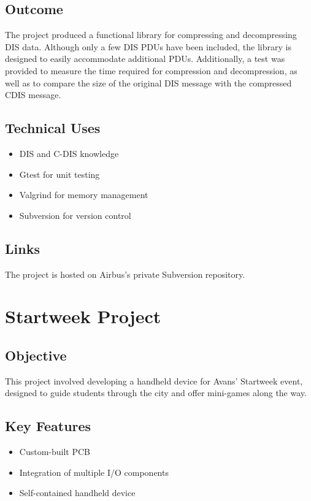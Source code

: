 \documentclass{article}
\begin{document}
\subsection{Outcome}
The project produced a functional library for compressing and decompressing DIS data. Although only a few DIS PDUs have been included, the library is designed to easily accommodate additional PDUs. Additionally, a test was provided to measure the time required for compression and decompression, as well as to compare the size of the original DIS message with the compressed CDIS message.
\subsection{Technical Uses}
\begin{itemize}
    \item DIS and C-DIS knowledge
    \item Gtest for unit testing
    \item Valgrind for memory management
    \item Subversion for version control
\end{itemize}

\subsection{Links}
The project is hosted on Airbus's private Subversion repository.

\section{Startweek Project}
\subsection{Objective}
This project involved developing a handheld device for Avans' Startweek event, designed to guide students through the city and offer mini-games along the way.

\subsection{Key Features}
\begin{itemize}
    \item Custom-built PCB
    \item Integration of multiple I/O components
    \item Self-contained handheld device
\end{itemize}
\end{document}
